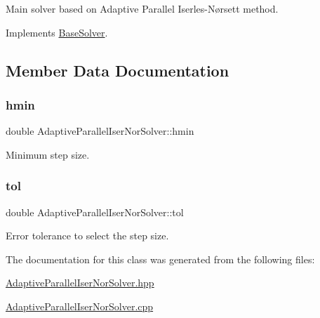 Main solver based on Adaptive Parallel Iserles-\/\+Nørsett method. 



Implements \hyperlink{classBaseSolver_a57f3b4ddec8693c61917aa37a2bac660}{Base\+Solver}.



\subsection{Member Data Documentation}
\mbox{\label{classAdaptiveParallelIserNorSolver_a0c7b56485dd75ab0a923dea7bdeabca0}} 
\subsubsection{\texorpdfstring{hmin}{hmin}}
{\footnotesize\ttfamily double Adaptive\+Parallel\+Iser\+Nor\+Solver\+::hmin\hspace{0.3cm}{\ttfamily [private]}}



Minimum step size. 

\mbox{\label{classAdaptiveParallelIserNorSolver_adfb74677c32e6d7d0e616566111a662d}} 
\subsubsection{\texorpdfstring{tol}{tol}}
{\footnotesize\ttfamily double Adaptive\+Parallel\+Iser\+Nor\+Solver\+::tol\hspace{0.3cm}{\ttfamily [private]}}



Error tolerance to select the step size. 



The documentation for this class was generated from the following files\+:\begin{DoxyCompactItemize}
\item 
\hyperlink{AdaptiveParallelIserNorSolver_8hpp}{Adaptive\+Parallel\+Iser\+Nor\+Solver.\+hpp}\item 
\hyperlink{AdaptiveParallelIserNorSolver_8cpp}{Adaptive\+Parallel\+Iser\+Nor\+Solver.\+cpp}\end{DoxyCompactItemize}
